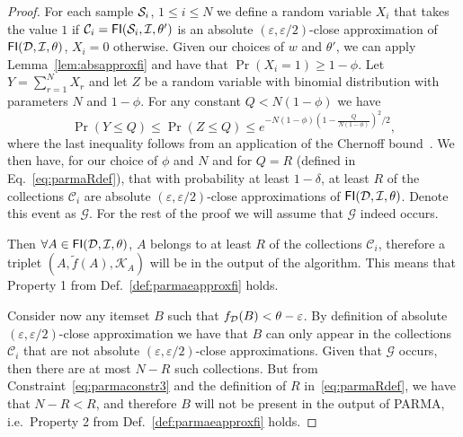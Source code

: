 \begin{proof}
  For each sample ${\cal S}_i$, $1\le i\le N$ we define a random variable $X_i$ that
  takes the value $1$ if $\mathcal{C}_i=\mathsf{FI}({\cal S}_i,{\cal I},\theta')$ is an absolute
  $(\varepsilon,\varepsilon/2)$-close approximation of $\mathsf{FI}({\cal D},{\cal I},\theta)$, $X_i=0$
  otherwise. Given our choices of $w$ and $\theta'$, we can apply
  Lemma~\ref{lem:absapproxfi} and have that $\Pr(X_i=1)\ge 1-\phi$. Let
  $Y=\sum_{r=1}^N X_r$ and let $Z$ be a random variable with binomial
  distribution with parameters $N$ and $1-\phi$. For any constant $Q<N(1-\phi)$ we have
  \[
  \Pr(Y\le Q)\le\Pr(Z\le Q)\le e^{-N(1-\phi)(1-\frac{Q}{N(1-\phi)})^2/2},
  \]
  where the last inequality follows from an application of the Chernoff
  bound~\cite[Chap.~4]{MitzenmacherU05}.
  We then have, for our choice of $\phi$ and $N$ and for $Q=R$
  (defined in Eq.~\eqref{eq:parmaRdef}), that with probability at least $1-\delta$,
  at least $R$ of the collections $\mathcal{C}_i$ are absolute
  $(\varepsilon,\varepsilon/2)$-close approximations of $\mathsf{FI}({\cal D},{\cal I},\theta)$. Denote
  this event as $\mathcal{G}$. For the rest of the proof we will assume that
  $\mathcal{G}$ indeed occurs.

  Then $\forall A\in\mathsf{FI}({\cal D},{\cal I},\theta)$, $A$ belongs to at least $R$ of the
  collections $\mathcal{C}_i$, therefore a triplet
  $(A,\tilde{f}(A),\mathcal{K}_A)$ will be in the output of the algorithm. This
  means that Property 1 from Def.~\ref{def:parmaeapproxfi} holds. 

  Consider now any itemset $B$ such that $f_{\cal D}(B)<\theta-\varepsilon$. By
  definition of absolute $(\varepsilon,\varepsilon/2)$-close approximation we have that $B$ can
  only appear in the collections $\mathcal{C}_i$ that are not absolute
  $(\varepsilon,\varepsilon/2)$-close approximations. Given
  that $\mathcal{G}$ occurs, then there are at most  $N-R$ such collections. But
  from Constraint~\eqref{eq:parmaconstr3} and the definition of $R$
  in~\eqref{eq:parmaRdef}, we have that $N-R< R$, and therefore $B$ will not be
  present in the output of PARMA, i.e.~Property 2 from Def.~\ref{def:parmaeapproxfi} holds.


\end{proof}
